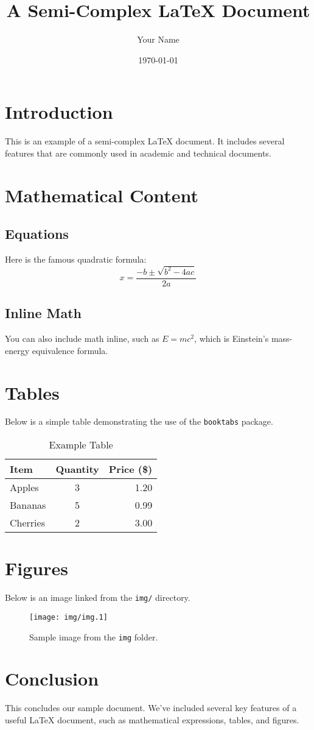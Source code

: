 \documentclass[12pt]{article}
\title{A Semi-Complex LaTeX Document}
\author{Your Name}
\date{\today}
\begin{document}
\maketitle

\tableofcontents
\newpage

\section{Introduction}
This is an example of a semi-complex \LaTeX{} document. It includes several features that are commonly used in academic and technical documents.

\section{Mathematical Content}
\subsection{Equations}
Here is the famous quadratic formula:
\[
x = \frac{-b \pm \sqrt{b^2 - 4ac}}{2a}
\]

\subsection{Inline Math}
You can also include math inline, such as $E = mc^2$, which is Einstein’s mass-energy equivalence formula.

\section{Tables}
Below is a simple table demonstrating the use of the \texttt{booktabs} package.

\begin{table}[h!]
    \centering
    \caption{Example Table}
    \begin{tabular}{lcr}
        \toprule
        Item & Quantity & Price (\$) \\
        \midrule
        Apples & 3 & 1.20 \\
        Bananas & 5 & 0.99 \\
        Cherries & 2 & 3.00 \\
        \bottomrule
    \end{tabular}
\end{table}

\section{Figures}
Below is an image linked from the \texttt{img/} directory.

\begin{figure}[h!]
    \centering
    \texttt{[image: img/img.1]}
    \caption{Sample image from the \texttt{img} folder.}
    \label{fig:sample-image}
\end{figure}

\section{Conclusion}
This concludes our sample document. We've included several key features of a useful LaTeX document, such as mathematical expressions, tables, and figures.
\end{document}
